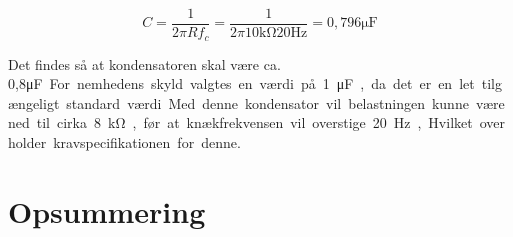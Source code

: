 \begin{equation}
	C = \frac{1}{2\pi Rf_c} = \frac{1}{2\pi 10\si{\kilo\ohm} 20\si{\hertz}} = 0,796\si{\micro\farad}
\label{eq:fchp2}
\end{equation}

Det findes så at kondensatoren skal være ca. 0,8\si\micro\farad.
For nemhedens skyld valgtes en værdi på 1\si\micro\farad, da det er en let tilgængeligt standard værdi.
Med denne kondensator vil belastningen kunne være ned til cirka 8\si\kilo\ohm, før at knækfrekvensen vil overstige 20\si\hertz, Hvilket overholder kravspecifikationen for denne.

\section{Opsummering}



